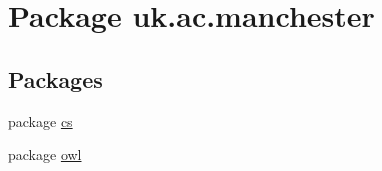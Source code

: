 \hypertarget{namespaceuk_1_1ac_1_1manchester}{\section{Package uk.\-ac.\-manchester}
\label{namespaceuk_1_1ac_1_1manchester}
}
\subsection*{Packages}
\begin{DoxyCompactItemize}
\item 
package \hyperlink{namespaceuk_1_1ac_1_1manchester_1_1cs}{cs}
\item 
package \hyperlink{namespaceuk_1_1ac_1_1manchester_1_1owl}{owl}
\end{DoxyCompactItemize}
